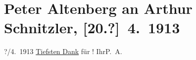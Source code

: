 

         \renewcommand{\erwaehnteOrte}{Orte: Otto-Wagner-Spital, Wien}
         \renewcommand{\erwaehnteWerke}{}
               \section[Peter Altenberg an Arthur Schnitzler, {[}20.?{]} 4. 1913]{ Peter Altenberg an Arthur Schnitzler, {[}20.?{]} 4. 1913}\nopagebreak{}\rehead{ }\begin{ledgroupsized}[t]{13cm}\normalsize\beginnumbering \toendnotes[C]{\smallbreak\pagebreak[2]} 
\toendnotes[C]{\smallbreak}\pstart
           \raggedleft{}{\pb}?/4. 1913\pend
           \pstart
           \uline{Tiefsten Dank} für \label{K_L02126_1v}\label{K_L02126_1h}! Ihr\hspace*{1.5em}\spacefill\mbox{P. A.}\pend
           
         
         \endnumbering{}\end{ledgroupsized}  \newcommand{\dateiname}{L02126}\newcommand{\titel}{Peter Altenberg an Arthur Schnitzler, [20.?] 4. 1913}\newcommand{\editorInnen}{Martin Anton Müller und Gerd-Hermann Susen}
      